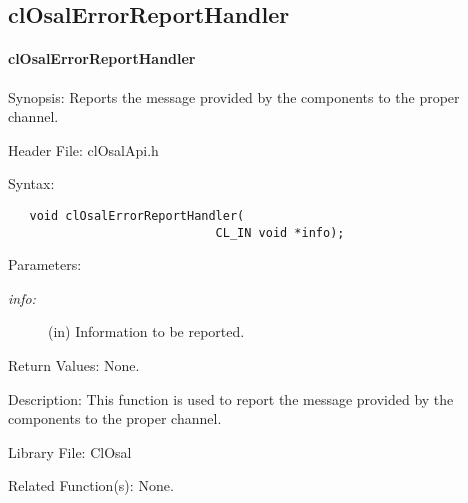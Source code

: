\newpage
\subsection{clOsalErrorReportHandler}
\hypertarget{pageosal154}{}\paragraph{cl\-Osal\-Error\-Report\-Handler}\label{pageosal154}
\begin{Desc}
\item[Synopsis:]Reports the message provided by the components to the proper channel.\end{Desc}
\begin{Desc}
\item[Header File:]clOsalApi.h\end{Desc}
\begin{Desc}
\item[Syntax:]

\footnotesize\begin{verbatim}   void clOsalErrorReportHandler(
                             CL_IN void *info);
\end{verbatim}
\normalsize
\end{Desc}
\begin{Desc}
\item[Parameters:]
\begin{description}
\item[{\em info:}](in) Information to be reported.\end{description}
\end{Desc}
\begin{Desc}
\item[Return Values:]None.\end{Desc}
\begin{Desc}
\item[Description:]This function is used to report the message provided by the components to the proper channel.\end{Desc}
\begin{Desc}
\item[Library File:]Cl\-Osal\end{Desc}
\begin{Desc}
\item[Related Function(s):]None. \end{Desc}


